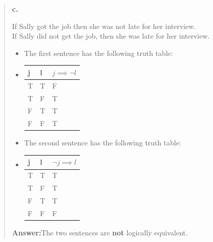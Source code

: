 \documentclass[11pt, oneside]{article}
\begin{document}
\pagebreak

\begin{quote}
    \textbf{c. }
    
    If Sally got the job then she was not late for her interview. \\
    If Sally did not get the job, then she was late for her interview.

    \begin{itemize}
        \item The first sentence has the following truth table:
        \item
            \begin{tabular}{ |p{0.5cm}|p{0.5cm}|p{2cm}|  }
                \hline
                j & l & $j \implies \neg l$ \\
                \hline
                T & T & F \\
                T & F & T \\
                F & T & T \\
                F & F & T \\
                \hline
            \end{tabular}
        \item The second sentence has the following truth table:
        \item
            \begin{tabular}{ |p{0.5cm}|p{0.5cm}|p{3cm}|  }
                \hline
                j & l & $\neg j \implies l$ \\
                \hline
                T & T & T \\
                T & F & T \\
                F & T & T \\
                F & F & F \\
                \hline
            \end{tabular}
    \end{itemize}

    \textbf{Answer:}\enspace The two sentences are \textbf{not} logically equivalent.
\end{quote}
\end{document}

